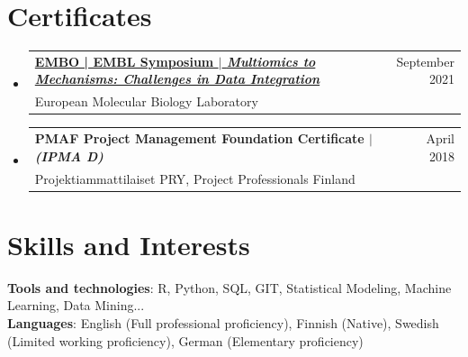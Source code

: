 \documentclass[A4,10pt]{article}
\makeatletter
\newcommand{\CVSubheading}[4]{
	\vspace{-2pt}\item
	\begin{tabular*}{0.97\textwidth}[t]{l@{\extracolsep{\fill}}r}
		\textbf{#1} & #2 \\
		\small#3 & \small #4 \\
	\end{tabular*}\vspace{-7pt}
}
\newcommand{\CVSubHeadingListStart}{\begin{itemize}[leftmargin=0.5cm, label={}]}
\newcommand{\CVSubHeadingListEnd}{\end{itemize}}
\makeatother
\begin{document}
	\section{Certificates}
	\CVSubHeadingListStart
	\CVSubheading
	{\href{https://emea-interface.ungerboeck.com/clients/EMBL/Prod/LinkedInCertificates/cert/147764_6070.pdf}{EMBO | EMBL Symposium $|$ \emph{\small{Multiomics to Mechanisms: Challenges in Data Integration}}}}{September 2021}
	{European Molecular Biology Laboratory}{}
	\CVSubheading
	{PMAF Project Management Foundation Certificate $|$ \emph{\small{(IPMA D)}}}{April 2018}
	{Projektiammattilaiset PRY, Project Professionals Finland}{}
	\CVSubHeadingListEnd

	\section{Skills and Interests}
	\begin{itemize}[leftmargin=0.5cm, label={}]
		\small{\item{
				\textbf{Tools and technologies}{: R, Python, SQL, GIT, Statistical Modeling, Machine Learning, Data Mining...} \\
				\textbf{Languages}{: English (Full professional proficiency), Finnish (Native), Swedish (Limited working proficiency), German (Elementary proficiency)} \\		
		}}
	\end{itemize}
\end{document}
